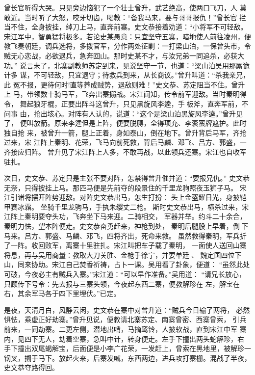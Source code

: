 曾长官听得大哭。只见旁边恼犯了一个壮士曾升，武艺绝高，使两口飞刀，人
莫敢近。当时听了大怒，咬牙切齿，喝教：“备我马来，要与哥哥报仇！”曾长官
拦当不住，全身披挂，绰刀上马，直奔前寨。史文恭接着劝道：“小将军不可轻敌。
宋江军中，智勇猛将极多。若论史某愚意：只宜坚守五寨，暗地使人前往凌州，便
教飞奏朝廷，调兵选将，多拨官军，分作两处征剿：一打梁山泊，一保曾头市，令
贼无心恋战，必欲退兵，急奔回山。那时史某不才，与汝兄弟一同追杀，必获大功。”
说言未了，北寨副教师苏定到来，见说坚守一节，也道：“梁山泊吴用那厮诡计多
谋，不可轻敌，只宜退守；待救兵到来，从长商议。”曾升叫道：“杀我亲兄，此
冤不报，更待何时!直等养成贼势，退敌则难！”史文恭、苏定阻当不住。曾升上
马，带领数十骑马军，飞奔出寨搦战。宋江闻知，传令前军迎敌。当时秦明得令，
舞起狼牙棍，正要出阵斗这曾升，只见黑旋风李逵，手板斧，直奔军前，不问事
由，抢出垓心。对阵有人认的，说道：“这个是梁山泊黑旋风李逵。”曾升见了，
便叫放箭。原来李逵但是上阵，便要脱膊，全得项充、李衮蛮牌遮护。此时独自抢
来，被曾升一箭，腿上正着，身如泰山，倒在地下。曾升背后马军，齐抢过来，宋
江阵上秦明、花荣，飞马向前死救，背后马麟、邓飞、吕方、郭盛，一齐接应归阵。
曾升见了宋江阵上人多，不敢再战，以此领兵还寨。宋江也自收军驻扎。

次日，史文恭、苏定只是主张不要对阵，怎禁得曾升催并道：“要报兄仇。”
史文恭无奈，只得披挂上马。那匹马便是先前夺的段景住的千里龙驹照夜玉狮子马。
宋江引诸将摆开阵势迎敌。对阵史文恭出马，怎生打扮：
头上金盔耀日光，身披铠甲赛冰霜。
坐骑千里龙驹马，手执朱缨丈二枪。
斯时史文恭出马，横杀过来，宋江阵上秦明要夺头功，飞奔坐下马来迎。二骑相交，
军器并举。约斗二十余合，秦明力怯，望本阵便走。史文恭奋勇赶来，神枪到处，
秦明后腿股上早着，倒下马来。吕方、郭盛、马麟、邓飞，四将齐出，死命来救。
虽然救得秦明，军兵折了一阵。收回败军，离寨十里驻扎。宋江叫把车子载了秦明，
一面使人送回山寨将息，再与吴用商量：教取大刀关胜、金枪手徐宁，并要单廷、
魏定国四位下山，同来协助。宋江自己焚香祈祷，占卜一课。吴用看了卦象，便道：
“虽然此处可破，今夜必主有贼兵入寨。”宋江道：“可以早作准备。”吴用道：
“请兄长放心，只顾传下号令：先去报与三寨头领，今夜起东西二寨，便教解珍在
左，解宝在右，其余军马各于四下里埋伏。”已定。

是夜，天清月白，风静云闲，史文恭在寨中对曾升道：“贼兵今日输了两将，
必然惧怯，乘虚正好劫寨。”曾升见说，便教请北寨苏定、南寨曾密、西寨曾索，
引兵前来，一同劫寨。二更左侧，潜地出哨，马摘鸾铃，人披软战，直到宋江中军
寨内，见四下无人，劫着空寨，急叫中计，转身便走。左手下撞出两头蛇解珍，右
手下撞出双尾蝎解宝，后面便是小李广花荣，一发赶上，曾索在黑地里，被解珍一
钢叉，搠于马下。放起火来，后寨发喊，东西两边，进兵攻打寨栅。混战了半夜，
史文恭夺路得回。

